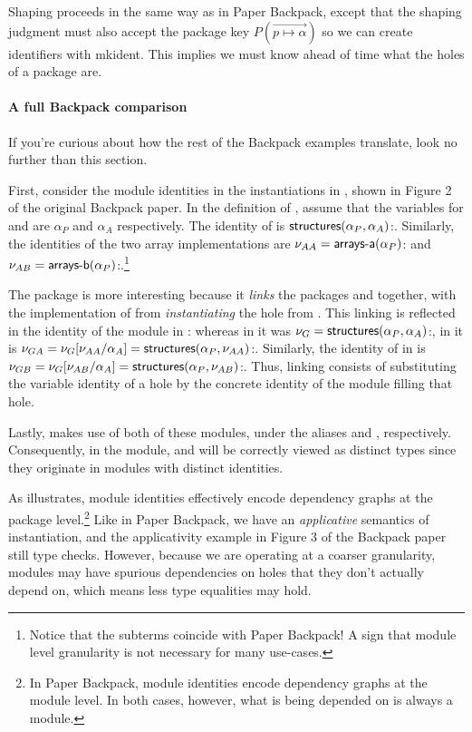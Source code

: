 \documentclass{article}
\begin{document}
Shaping proceeds in the same way as in Paper Backpack, except that the
shaping judgment must also accept the package key
$P(\vec{p\mapsto\alpha})$ so we can create identifiers with
\textsf{mkident}.  This implies we must know ahead of time what the holes
of a package are.

\paragraph{A full Backpack comparison}
If you're curious about how the rest of the Backpack examples translate,
look no further than this section.

First, consider the module identities in the  instantiations in
, shown in Figure 2 of the original Backpack paper.
In the definition of , assume that the variables for
 and  are $\alpha_P$ and $\alpha_A$ respectively.
The identity of  is $\textsf{structures}(\alpha_P, \alpha_A)$:. Similarly, the identities of the two array implementations
are $\nu_{AA} = \textsf{arrays-a}(\alpha_P)$: and
$\nu_{AB} = \textsf{arrays-b}(\alpha_P)$:.\footnote{Notice that the subterms coincide with Paper Backpack!  A sign that module level granularity is not necessary for many use-cases.}

The package  is more interesting because it
\emph{links} the packages  and 
together, with the implementation of  from 
\emph{instantiating} the hole  from .  This
linking is reflected in the identity of the  module in
: whereas in  it was $\nu_G =
\textsf{structures}(\alpha_P, \alpha_A)$:, in  it is
$\nu_{GA} = \nu_G[\nu_{AA}/\alpha_A] = \textsf{structures}(\alpha_P, \nu_{AA})$:.  Similarly, the identity of  in
 is $\nu_{GB} = \nu_G[\nu_{AB}/\alpha_A] =
\textsf{structures}(\alpha_P, \nu_{AB})$:.  Thus, linking consists
of substituting the variable identity of a hole by the concrete
identity of the module filling that hole.

Lastly,  makes use of both of these 
modules, under the aliases  and , respectively.
Consequently, in the  module,  and
 will be correctly viewed as distinct types since they
originate in modules with distinct identities.

As  illustrates, module identities effectively encode
dependency graphs at the package level.\footnote{In Paper Backpack, module identities
encode dependency graphs at the module level.  In both cases, however, what is being
depended on is always a module.}  Like in Paper Backpack, we have an \emph{applicative}
semantics of instantiation, and the applicativity example in Figure 3 of the
Backpack paper still type checks.  However, because we are operating at a coarser
granularity, modules may have spurious dependencies on holes that they don't
actually depend on, which means less type equalities may hold.
\end{document}
